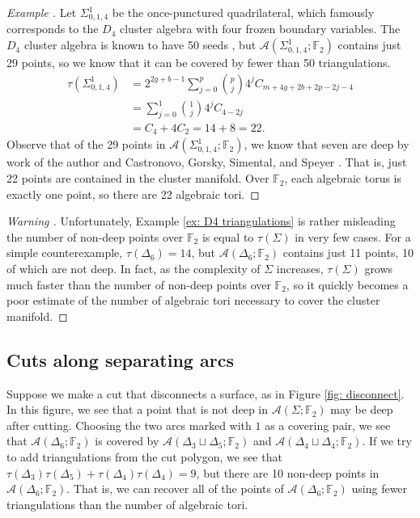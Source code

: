 \documentclass[reqno,12pt]{amsart}
\theoremstyle{definition}
\theoremstyle{remark}
\theoremstyle{remark}
\newenvironment{ex}{\refstepcounter{thm}\begin{proof}[Example \emph{\thethm}]\renewcommand*{\qedsymbol}{\(\blacksquare\)}}{\end{proof}}
\newenvironment{warn}{\refstepcounter{thm}\begin{proof}[Warning \emph{\thethm}]\renewcommand*{\qedsymbol}{\(\blacksquare\)}}{\end{proof}}
\numberwithin{equation}{section}
\begin{document}
\begin{ex}\label{ex: D4 triangulations}
    Let $\Sigma_{0,1,4}^1$ be the once-punctured quadrilateral, which famously corresponds to the $D_4$ cluster algebra with four frozen boundary variables. The $D_4$ cluster algebra is known to have 50 seeds \cite[Proposition 5.9.1]{FWZChapters45}, but $\mathcal{A}(\Sigma_{0,1,4}^1; \mathbb{F}_2)$ contains just 29 points, so we know that it can be covered by fewer than 50 triangulations.
    \begin{align*}
        \tau (\Sigma_{0,1,4}^1) &= 2^{2g+b-1} \sum_{j=0}^p \binom{p}{j} 4^{j} C_{m + 4g + 2b +2p - 2j- 4} \\
        &= \sum_{j=0}^1 \binom{1}{j} 4^j C_{4-2j} \\
        &= C_4 + 4C_2 = 14 + 8 = 22.
    \end{align*}
    Observe that of the 29 points in $\mathcal{A}(\Sigma_{0,1,4}^1; \mathbb{F}_2)$, we know that seven are deep by work of the author \cite[Remark 7.3.2]{BeyerDissertation} and Castronovo, Gorsky, Simental, and Speyer \cite[Remark 6.11]{CGSS26}. 
    That is, just 22 points are contained in the cluster manifold. Over $\mathbb{F}_2$, each algebraic torus is exactly one point, so there are 22 algebraic tori.
\end{ex}

\begin{warn}
Unfortunately, Example \ref{ex: D4 triangulations} is rather misleading \textemdash the number of non-deep points over $\mathbb{F}_2$ is equal to $\tau (\Sigma)$ in very few cases. For a simple counterexample, $\tau(\Delta_6) = 14$, but $\mathcal{A}(\Delta_6; \mathbb{F}_2)$ contains just 11 points, 10 of which are not deep. In fact, as the complexity of $\Sigma$ increases, $\tau(\Sigma)$ grows much faster than the number of non-deep points over $\mathbb{F}_2$, so it quickly becomes a poor estimate of the number of algebraic tori necessary to cover the cluster manifold.
\end{warn}

\subsection{Cuts along separating arcs}

Suppose we make a cut that disconnects a surface, as in Figure \ref{fig: disconnect}. In this figure, we see that a point that is not deep in $\mathcal{A}(\Sigma;\mathbb{F}_2)$ may be deep after cutting. Choosing the two arcs marked with $1$ as a covering pair, we see that $\mathcal{A}(\Delta_6;\mathbb{F}_2)$ is covered by $\mathcal{A}(\Delta_3 \sqcup \Delta_5; \mathbb{F}_2)$ and $\mathcal{A}(\Delta_4 \sqcup \Delta_4; \mathbb{F}_2)$. 
If we try to add triangulations from the cut polygon, we see that $\tau(\Delta_3)\tau(\Delta_5) + \tau(\Delta_4)\tau(\Delta_4) = 9$, but there are 10 non-deep points in $\mathcal{A}(\Delta_6;\mathbb{F}_2)$. That is, we can recover all of the points of $\mathcal{A}(\Delta_6;\mathbb{F}_2)$ using fewer triangulations than the number of algebraic tori.
\end{document}
